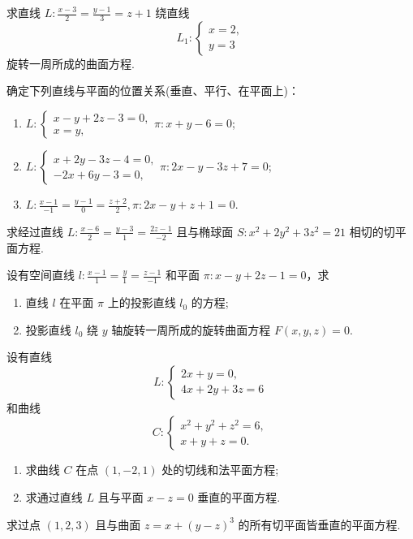 	\begin{ti}
		求直线 $L: \frac{x - 3}{2} = \frac{y - 1}{3} = z + 1$ 绕直线
		\[
			L_{1}: \begin{cases}
				x = 2,\\
				y = 3
			\end{cases}
		\]
		旋转一周所成的曲面方程.
	\end{ti}

	\begin{ti}
		确定下列直线与平面的位置关系(垂直、平行、在平面上)：
		\begin{enumerate}
			\item $L: \begin{cases}
				x - y + 2z - 3 = 0,\\
				x = y,
			\end{cases} \pi: x + y - 6 = 0$;
			\item $L: \begin{cases}
				x + 2y - 3z -4 = 0,\\
				-2x + 6y - 3 = 0,
			\end{cases} \pi: 2x - y - 3z + 7 = 0$;
			\item $L: \frac{x - 1}{-1} = \frac{y - 1}{0} = \frac{z + 2}{2}, \pi: 2x - y + z + 1 = 0$.
		\end{enumerate}
	\end{ti}

	\begin{ti}
		求经过直线 $L: \frac{x - 6}{2} = \frac{y - 3}{1} = \frac{2z - 1}{-2}$ 且与椭球面 $S: x^{2} + 2y^{2} + 3z^{2} = 21$ 相切的切平面方程.
	\end{ti}

	\begin{ti}
		设有空间直线 $l: \frac{x - 1}{1} = \frac{y}{1} = \frac{z - 1}{-1}$ 和平面 $\pi: x - y + 2z - 1 = 0$，求
		\begin{enumerate}
			\item 直线 $l$ 在平面 $\pi$ 上的投影直线 $l_{0}$ 的方程;
			\item 投影直线 $l_{0}$ 绕 $y$ 轴旋转一周所成的旋转曲面方程 $F(x,y,z) = 0$.
		\end{enumerate}
	\end{ti}

	\begin{ti}
		设有直线
		\[
			L: \begin{cases}
				2x + y = 0,\\
				4x + 2y + 3z = 6
			\end{cases}
		\]
		和曲线
		\[
			C: \begin{cases}
				x^{2} + y^{2} + z^{2} = 6,\\
				x + y + z = 0.
			\end{cases}
		\]
		\begin{enumerate}
			\item 求曲线 $C$ 在点 $(1,-2,1)$ 处的切线和法平面方程;
			\item 求通过直线 $L$ 且与平面 $x - z = 0$ 垂直的平面方程.
		\end{enumerate}
	\end{ti}

	\begin{ti}
		求过点 $(1,2,3)$ 且与曲面 $z = x + (y - z)^{3}$ 的所有切平面皆垂直的平面方程.
	\end{ti}